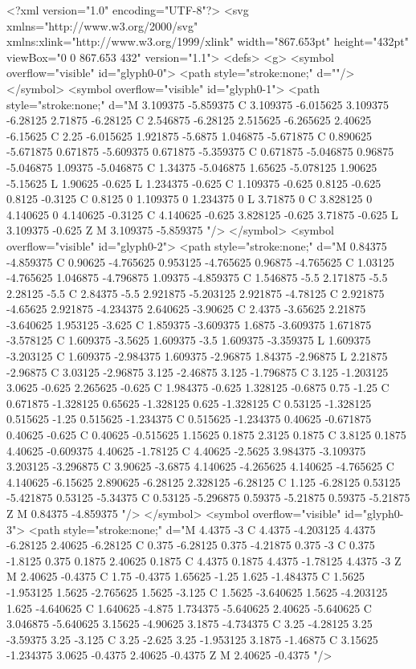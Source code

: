 <?xml version="1.0" encoding="UTF-8"?>
<svg xmlns="http://www.w3.org/2000/svg" xmlns:xlink="http://www.w3.org/1999/xlink" width="867.653pt" height="432pt" viewBox="0 0 867.653 432" version="1.1">
<defs>
<g>
<symbol overflow="visible" id="glyph0-0">
<path style="stroke:none;" d=""/>
</symbol>
<symbol overflow="visible" id="glyph0-1">
<path style="stroke:none;" d="M 3.109375 -5.859375 C 3.109375 -6.015625 3.109375 -6.28125 2.71875 -6.28125 C 2.546875 -6.28125 2.515625 -6.265625 2.40625 -6.15625 C 2.25 -6.015625 1.921875 -5.6875 1.046875 -5.671875 C 0.890625 -5.671875 0.671875 -5.609375 0.671875 -5.359375 C 0.671875 -5.046875 0.96875 -5.046875 1.09375 -5.046875 C 1.34375 -5.046875 1.65625 -5.078125 1.90625 -5.15625 L 1.90625 -0.625 L 1.234375 -0.625 C 1.109375 -0.625 0.8125 -0.625 0.8125 -0.3125 C 0.8125 0 1.109375 0 1.234375 0 L 3.71875 0 C 3.828125 0 4.140625 0 4.140625 -0.3125 C 4.140625 -0.625 3.828125 -0.625 3.71875 -0.625 L 3.109375 -0.625 Z M 3.109375 -5.859375 "/>
</symbol>
<symbol overflow="visible" id="glyph0-2">
<path style="stroke:none;" d="M 0.84375 -4.859375 C 0.90625 -4.765625 0.953125 -4.765625 0.96875 -4.765625 C 1.03125 -4.765625 1.046875 -4.796875 1.09375 -4.859375 C 1.546875 -5.5 2.171875 -5.5 2.28125 -5.5 C 2.84375 -5.5 2.921875 -5.203125 2.921875 -4.78125 C 2.921875 -4.65625 2.921875 -4.234375 2.640625 -3.90625 C 2.4375 -3.65625 2.21875 -3.640625 1.953125 -3.625 C 1.859375 -3.609375 1.6875 -3.609375 1.671875 -3.578125 C 1.609375 -3.5625 1.609375 -3.5 1.609375 -3.359375 L 1.609375 -3.203125 C 1.609375 -2.984375 1.609375 -2.96875 1.84375 -2.96875 L 2.21875 -2.96875 C 3.03125 -2.96875 3.125 -2.46875 3.125 -1.796875 C 3.125 -1.203125 3.0625 -0.625 2.265625 -0.625 C 1.984375 -0.625 1.328125 -0.6875 0.75 -1.25 C 0.671875 -1.328125 0.65625 -1.328125 0.625 -1.328125 C 0.53125 -1.328125 0.515625 -1.25 0.515625 -1.234375 C 0.515625 -1.234375 0.40625 -0.671875 0.40625 -0.625 C 0.40625 -0.515625 1.15625 0.1875 2.3125 0.1875 C 3.8125 0.1875 4.40625 -0.609375 4.40625 -1.78125 C 4.40625 -2.5625 3.984375 -3.109375 3.203125 -3.296875 C 3.90625 -3.6875 4.140625 -4.265625 4.140625 -4.765625 C 4.140625 -6.15625 2.890625 -6.28125 2.328125 -6.28125 C 1.125 -6.28125 0.53125 -5.421875 0.53125 -5.34375 C 0.53125 -5.296875 0.59375 -5.21875 0.59375 -5.21875 Z M 0.84375 -4.859375 "/>
</symbol>
<symbol overflow="visible" id="glyph0-3">
<path style="stroke:none;" d="M 4.4375 -3 C 4.4375 -4.203125 4.4375 -6.28125 2.40625 -6.28125 C 0.375 -6.28125 0.375 -4.21875 0.375 -3 C 0.375 -1.8125 0.375 0.1875 2.40625 0.1875 C 4.4375 0.1875 4.4375 -1.78125 4.4375 -3 Z M 2.40625 -0.4375 C 1.75 -0.4375 1.65625 -1.25 1.625 -1.484375 C 1.5625 -1.953125 1.5625 -2.765625 1.5625 -3.125 C 1.5625 -3.640625 1.5625 -4.203125 1.625 -4.640625 C 1.640625 -4.875 1.734375 -5.640625 2.40625 -5.640625 C 3.046875 -5.640625 3.15625 -4.90625 3.1875 -4.734375 C 3.25 -4.28125 3.25 -3.59375 3.25 -3.125 C 3.25 -2.625 3.25 -1.953125 3.1875 -1.46875 C 3.15625 -1.234375 3.0625 -0.4375 2.40625 -0.4375 Z M 2.40625 -0.4375 "/>
